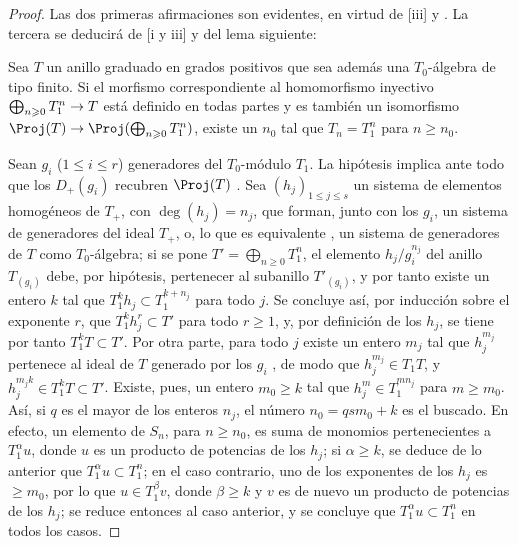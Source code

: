 \documentclass[oneside,10pt]{amsart}
\makeatletter
\renewcommand{\leq}{\leqslant}
\renewcommand{\geq}{\geqslant}
\newcommand{\ega@arrow}[2]{\mathchoice{#1}{#2}{#2}{#2}}
\renewcommand{\to}{\ega@arrow{\longrightarrow}{\rightarrow}}
\newcommand{\oldpage}[2][]{\marginnote{\normalfont\footnotesize\textbf{#1}~|~#2}\ignorespaces}
\let\EGAOriginalLabel\label
\renewcommand{\label}[1]{\phantomsection\EGAOriginalLabel{#1}}
\makeatother
\begin{document}
\begin{proof}
Las dos primeras afirmaciones son evidentes, en virtud de [iii] y .
La tercera se deducirá de [i y iii] y del lema siguiente:
\begin{lemma}[8.2.14.1]
\label{II.8.2.14.1}
Sea $T$ un anillo graduado en grados positivos que sea además una $T_0$-álgebra de tipo finito.
Si el morfismo correspondiente al homomorfismo inyectivo $\bigoplus_{n\geq0}T_1^n\to T$ está definido en todas partes y es también un isomorfismo $\Proj(T)\to\Proj(\bigoplus_{n\geq0}T_1^n)$, existe un $n_0$ tal que $T_n=T_1^n$ para $n\geq n_0$.
\end{lemma}

Sean $g_i$ ($1\leq i\leq r$) generadores del $T_0$-módulo $T_1$.
La hipótesis implica ante todo que los $D_+(g_i)$ recubren $\Proj(T)$ .
Sea $(h_j)_{1\leq j\leq s}$ un sistema de elementos homogéneos de $T_+$, con $\deg(h_j)=n_j$, que forman, junto con los $g_i$, un sistema de generadores del ideal $T_+$, o, lo que es equivalente , un sistema de generadores de $T$ como $T_0$-álgebra;
si se pone $T'=\bigoplus_{n\geq0}T_1^n$, el elemento $h_j/g_i^{n_j}$ del anillo $T_{(g_i)}$ debe, por hipótesis, pertenecer al subanillo $T'_{(g_i)}$, y por tanto existe un entero $k$ tal que $T_1^k h_j\subset T_1^{k+n_j}$ para todo $j$.
Se concluye así, por inducción sobre el exponente $r$, que $T_1^k h_j^r \subset T'$ para todo $r\geq1$, y, por definición de los $h_j$, se tiene por tanto $T_1^k T\subset T'$.
Por otra parte, para todo $j$ existe un entero $m_j$ tal que $h_j^{m_j}$ pertenece al ideal de $T$ generado por los $g_i$ , de modo que $h_j^{m_j}\in T_1 T$, y
\oldpage[II]{162}
$h_j^{m_j k}\in T_1^k T\subset T'$.
Existe, pues, un entero $m_0\geq k$ tal que $h_j^m\in T_1^{m n_j}$ para $m\geq m_0$.
Así, si $q$ es el mayor de los enteros $n_j$, el número $n_0=q s m_0+k$ es el buscado.
En efecto, un elemento de $S_n$, para $n\geq n_0$, es suma de monomios pertenecientes a $T_1^\alpha u$, donde $u$ es un producto de potencias de los $h_j$;
si $\alpha\geq k$, se deduce de lo anterior que $T_1^\alpha u\subset T_1^n$;
en el caso contrario, uno de los exponentes de los $h_j$ es $\geq m_0$, por lo que $u\in T_1^\beta v$, donde $\beta\geq k$ y $v$ es de nuevo un producto de potencias de los $h_j$;
se reduce entonces al caso anterior, y se concluye que $T_1^\alpha u\subset T_1^n$ en todos los casos.
\end{proof}
\end{document}
